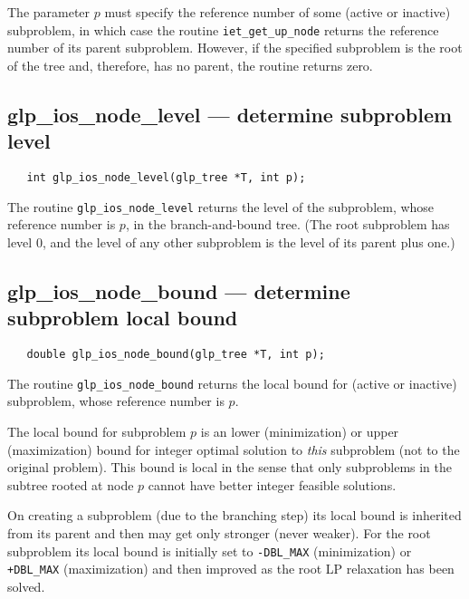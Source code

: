 The parameter $p$ must specify the reference number of some (active or
inactive) subproblem, in which case the routine \verb|iet_get_up_node|
returns the reference number of its parent subproblem. However, if the
specified subproblem is the root of the tree and, therefore, has
no parent, the routine returns zero.

\subsection{glp\_ios\_node\_level --- determine subproblem level}

\synopsis

\begin{verbatim}
   int glp_ios_node_level(glp_tree *T, int p);
\end{verbatim}

\returns

The routine \verb|glp_ios_node_level| returns the level of the
subproblem, whose reference number is $p$, in the branch-and-bound
tree. (The root subproblem has level 0, and the level of any other
subproblem is the level of its parent plus one.)

\subsection{glp\_ios\_node\_bound --- determine subproblem local bound}

\synopsis

\begin{verbatim}
   double glp_ios_node_bound(glp_tree *T, int p);
\end{verbatim}

\returns

The routine \verb|glp_ios_node_bound| returns the local bound for
(active or inactive) subproblem, whose reference number is $p$.


The local bound for subproblem $p$ is an lower (minimization) or upper
(maximization) bound for integer optimal solution to {\it this}
subproblem (not to the original problem). This bound is local in the
sense that only subproblems in the subtree rooted at node $p$ cannot
have better integer feasible solutions.

On creating a subproblem (due to the branching step) its local bound is
inherited from its parent and then may get only stronger (never weaker).
For the root subproblem its local bound is initially set to
\verb|-DBL_MAX| (minimization) or \verb|+DBL_MAX| (maximization) and
then improved as the root LP relaxation has been solved.

